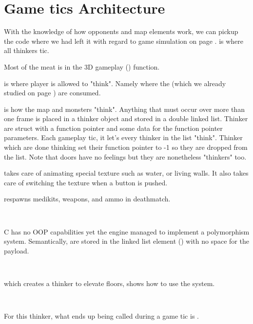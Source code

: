\section{Game tics Architecture}
With the knowledge of how opponents and map elements work, we can pickup the code where we had left it with regard to game simulation on page \pageref{TryRunTics.c}.  is where all thinkers tic.\\
\par
{}
\par
Most of the meat is in the 3D gameplay () function.\\
\par
{}
\par
{} is where player is allowed to "think". Namely where the  (which we already studied on page \pageref{cmd_t_type}) are consumed.\\
\par 
{} is how the map and monsters "think". Anything that must occur over more than one frame is placed in a thinker object and stored in a double linked list. Thinker are struct with a function pointer and some data for the function pointer parameters. Each gameplay tic, it let's every thinker in the list "think". Thinker which are done thinking set their function pointer to -1 so they are dropped from the list. Note that doors have no feelings but they are nonetheless "thinkers" too.\\
\par
{} takes care of animating special texture such as water, or living walls. It also takes care of switching the texture when a button is pushed.\\
\par 

  respawns medikits, weapons, and ammo in deathmatch.




\\
\par
C has no OOP capabilities yet the engine managed to implement a polymorphism system. Semantically,  are stored in the linked list element () with no space for the payload. \\%
\par
{}\\
\par
{} which creates a thinker to elevate floors, shows how to use the system.\\
\par
{}\\
\par
For this thinker, what ends up being called during a game tic is .
